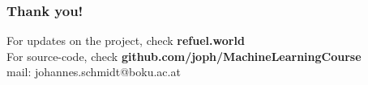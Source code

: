\documentclass[color=usenames,dvipsnames]{beamer}
\begin{document}
{


\begin{frame}
\frametitle{Thank you!}
\begin{block}{
 For updates on the project, check \textbf{refuel.world}\\
 For source-code, check \textbf{github.com/joph/MachineLearningCourse}\\
 
		mail: johannes.schmidt@boku.ac.at\\

}
\end{block}

\vspace{2.5 cm}


\end{frame}

}
\end{document}
